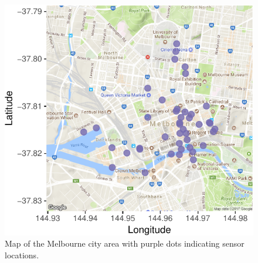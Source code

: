 \documentclass[article]{jss}
\theoremstyle{definition}
\theoremstyle{definition}
\theoremstyle{definition}
\theoremstyle{remark}
\begin{document}
\begin{CodeChunk}
\begin{figure}

{\centering \includegraphics[width=0.55\linewidth]{figure/ped-map-1} 

}

\caption[Map of the Melbourne city area with purple dots
indicating sensor locations.]{Map of the Melbourne city area with purple dots
indicating sensor locations.}\label{fig:ped-map}
\end{figure}
\end{CodeChunk}
\end{document}
